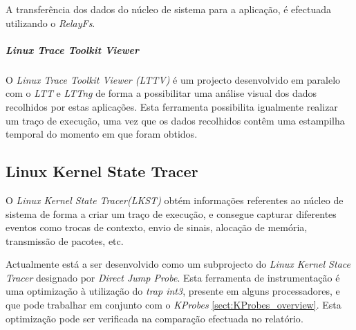 A transferência dos dados do núcleo de sistema para a aplicação, é efectuada utilizando o \textit{RelayFs}.


\subparagraph{Linux Trace Toolkit Viewer}\label{cap:lttv_overview}
O \textit{Linux Trace Toolkit Viewer (LTTV)} é um projecto desenvolvido em paralelo com o \textit{LTT} e \textit{LTTng} de forma a possibilitar uma análise visual dos dados recolhidos por estas aplicações.
Esta ferramenta possibilita igualmente realizar um traço de execução, uma vez que os dados recolhidos contêm uma estampilha temporal do momento em que foram obtidos.


\subsection{Linux Kernel State Tracer}

O \textit{Linux Kernel State Tracer(LKST)} obtém informações referentes ao núcleo de sistema de forma a criar um traço de execução, e consegue capturar diferentes eventos como trocas de contexto, envio de sinais, alocação de memória, transmissão de pacotes, etc.

\label{cap:djprobe}
Actualmente está a ser desenvolvido como um subprojecto do \textit{Linux Kernel Stace Tracer} designado por \textit{Direct Jump Probe}.
Esta ferramenta de instrumentação é uma optimização à utilização do \textit{trap int3}, presente em alguns processadores, e que pode trabalhar em conjunto com o \textit{KProbes} \ref{sect:KProbes_overview}.
Esta optimização pode ser verificada na comparação efectuada no relatório\cite{Hiramatsu2005}.
 
